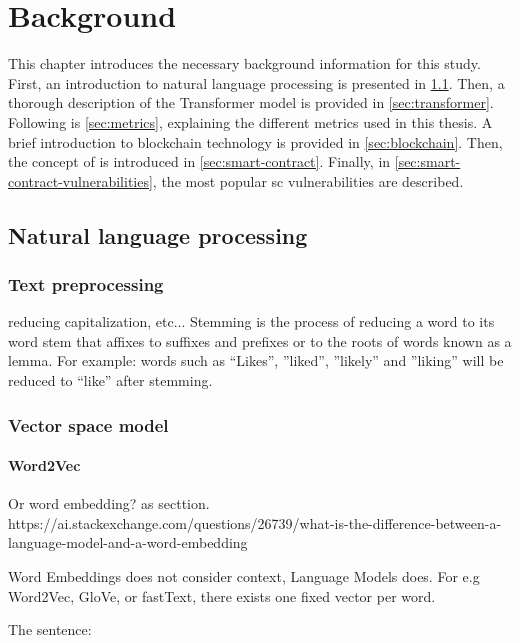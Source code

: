 \chapter{Background}
\label{chap:background}
This chapter introduces the necessary background information for this study. First, an introduction to natural language processing is presented in \cref{sec:natural-language-processing}. Then, a thorough description of the Transformer model is provided in \cref{sec:transformer}. Following is \cref{sec:metrics}, explaining the different metrics used in this thesis. A brief introduction to blockchain technology is provided in \cref{sec:blockchain}. Then, the concept of  is introduced in \cref{sec:smart-contract}. Finally, in \cref{sec:smart-contract-vulnerabilities}, the most popular \acrshort{sc} vulnerabilities are described.

\section{Natural language processing}
\label{sec:natural-language-processing}

\subsection{Text preprocessing}
\label{sec:textt-preprocessing}
reducing capitalization, etc...
Stemming is the process of reducing a word to its word stem that affixes to suffixes and prefixes or to the roots of words known as a lemma. For example: words such as “Likes”, ”liked”, ”likely” and ”liking” will be reduced to “like” after stemming.

\subsection{Vector space model}
\label{sec:vector-space-model}

\subsubsection{Word2Vec}
\label{sec:vord2vec}
Or word embedding? as secttion.
https://ai.stackexchange.com/questions/26739/what-is-the-difference-between-a-language-model-and-a-word-embedding

Word Embeddings does not consider context, Language Models does.
For e.g Word2Vec, GloVe, or fastText, there exists one fixed vector per word.


The sentence:

